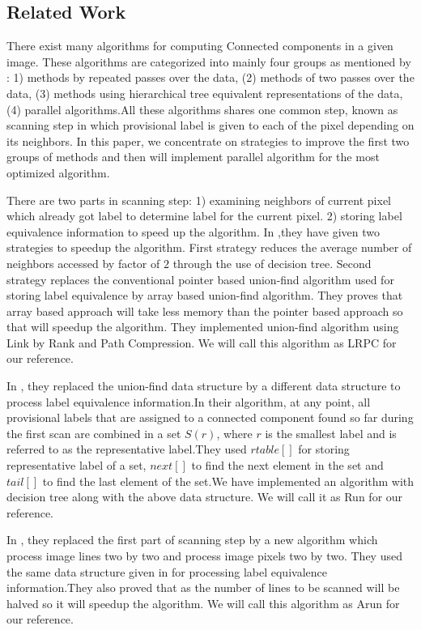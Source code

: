 \subsection{Related Work}
\label{sec:relatedworks}

There exist many algorithms for computing Connected components in a given image. These algorithms are categorized into
mainly four groups as mentioned by \cite{Suzuki2003_Linear}: 1) methods by repeated passes over the data,
(2) methods of two passes over the data, (3) methods using hierarchical tree equivalent representations of the data,
(4) parallel algorithms.All these algorithms shares one common step, known as scanning step in which provisional label 
is given to each of the pixel depending on its neighbors. In this paper, we concentrate on strategies to improve the first
two groups of methods and then will implement parallel algorithm for the most optimized algorithm.

There are two parts in scanning step: 1) examining neighbors of current pixel which already got label to determine label 
for the current pixel. 2) storing label equivalence information to speed up the algorithm. In \cite{Wu2009_LRPC} ,they have 
given two strategies to speedup the algorithm. First strategy reduces the average number of neighbors accessed by factor of 
$2$ through the use of decision tree. Second strategy replaces the conventional pointer based union-find algorithm used for
storing label equivalence by array based union-find algorithm. They proves that array based approach will take less memory 
than the pointer based approach so that will speedup the algorithm. They implemented union-find algorithm using Link by 
Rank and Path Compression. We will call this algorithm as LRPC for our reference.

In \cite{He2008_Run}, they replaced the union-find data structure by a different data structure to process label 
equivalence information.In their algorithm, at any point, all provisional labels that are assigned to a connected component
found so far during the first scan are combined in a set $S(r)$, where $r$ is the smallest label and is referred to as the
representative label.They used $rtable[]$ for storing representative label of a set, $next[]$ to find the next element in 
the set and $tail[]$ to find the last element of the set.We have implemented an algorithm with decision tree along with 
the above data structure. We will call it as Run for our reference.

In \cite{He2012_ARun}, they replaced the first part of scanning step by a new algorithm which process image lines two by 
two and process image pixels two by two. They used the same data structure given in \cite{He2008_Run} for processing label 
equivalence information.They also proved that as the number of lines to be scanned will be halved so it will speedup the 
algorithm. We will call this algorithm as Arun for our reference.

